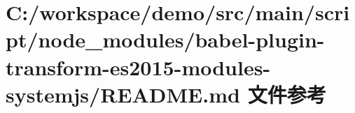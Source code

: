 \hypertarget{node__modules_2babel-plugin-transform-es2015-modules-systemjs_2_r_e_a_d_m_e_8md}{}\section{C\+:/workspace/demo/src/main/script/node\+\_\+modules/babel-\/plugin-\/transform-\/es2015-\/modules-\/systemjs/\+R\+E\+A\+D\+ME.md 文件参考}
\label{node__modules_2babel-plugin-transform-es2015-modules-systemjs_2_r_e_a_d_m_e_8md}
